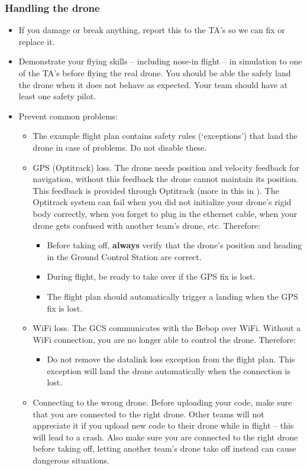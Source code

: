 \subsubsection*{Handling the drone}
\begin{itemize}
	\item If you damage or break anything, report this to the TA's so we can fix or replace it.
	\item Demonstrate your flying skills -- including nose-in flight -- in simulation to one of the TA's before flying the real drone. You should be able the safely land the drone when it does not behave as expected. Your team should have at least one safety pilot.
	\item Prevent common problems:
	\begin{itemize}
		\item The example flight plan contains safety rules (`exceptions') that land the drone in case of problems. Do not disable these.
		\item GPS (Optitrack) loss. The drone needs position and velocity feedback for navigation, without this feedback the drone cannot maintain its position. This feedback is provided through Optitrack (more in this in ). The Optitrack system can fail when you did not initialize your drone's rigid body correctly, when you forget to plug in the ethernet cable, when your drone gets confused with another team's drone, etc. Therefore:
		\begin{itemize}
			\item Before taking off, \textbf{always} verify that the drone's position and heading in the Ground Control Station are correct.
			\item During flight, be ready to take over if the GPS fix is lost.
			\item The flight plan should automatically trigger a landing when the GPS fix is lost.
		\end{itemize}
		\item WiFi loss. The GCS communicates with the Bebop over WiFi. Without a WiFi connection, you are no longer able to control the drone. Therefore:
		\begin{itemize}
			\item Do not remove the datalink loss exception from the flight plan. This exception will land the drone automatically when the connection is lost.
		\end{itemize}
		\item Connecting to the wrong drone. Before uploading your code, make sure that you are connected to the right drone. Other teams will not appreciate it if you upload new code to their drone while in flight -- this will lead to a crash. Also make sure you are connected to the right drone before taking off, letting another team's drone take off instead can cause dangerous situations.

\end{itemize}
\end{itemize}
